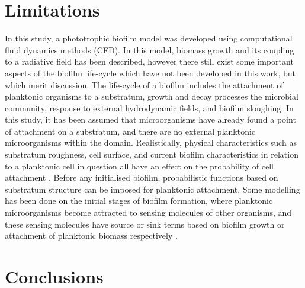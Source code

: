 \section{Limitations}
In this study, a phototrophic biofilm model was developed using computational fluid dynamics methods (CFD). In this model, biomass growth and its coupling to a radiative field has been described, however there still exist some important aspects of the biofilm life-cycle which have not been developed in this work, but which merit discussion. The life-cycle of a biofilm includes the attachment of planktonic organisms to a substratum, growth and decay processes the microbial community, response to external hydrodynamic fields, and biofilm sloughing.
\skippingparagraph
In this study, it has been assumed that microorganisms have already found a point of attachment on a substratum, and there are no external planktonic microorganisms within the domain. Realistically, physical characteristics such as substratum roughness, cell surface, and current biofilm characteristics in relation to a planktonic cell in question all have an effect on the probability of cell attachment \cite{donlan2002}. Before any initialised biofilm, probabilistic functions based on substratum structure can be imposed for planktonic attachment. Some modelling has been done on the initial stages of biofilm formation, where planktonic microorganisms become attracted to sensing molecules of other organisms, and these sensing molecules have source or sink terms based on biofilm growth or attachment of planktonic biomass respectively \cite{moustaid2013}. 











\section{Conclusions}
